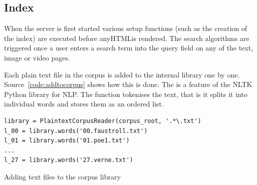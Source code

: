 

\subsection{Index}
\label{s:index}

When the server is first started various setup functions (such as the creation of the index) are executed before any\ac{HTML}is rendered. The search algorithms are triggered once a user enters a search term into the query field on any of the text, image or video pages.

Each plain text file in the corpus is added to the internal library one by one. Source~\ref{code:addtocorpus} shows how this is done. The  is a feature of the \ac{NLTK} Python library \autocite{NLTK2016} for \acl{NLP}. The  function tokenises the text, that is it splits it into individual words and stores them as an ordered list.

\begin{listing}[!htbp] %
  \begin{verbatim}
library = PlaintextCorpusReader(corpus_root, '.*\.txt')
l_00 = library.words('00.faustroll.txt')
l_01 = library.words('01.poe1.txt')
...
l_27 = library.words('27.verne.txt')
  \end{verbatim}
\caption{Adding text files to the corpus library}
\label{code:addtocorpus}
\end{listing}


